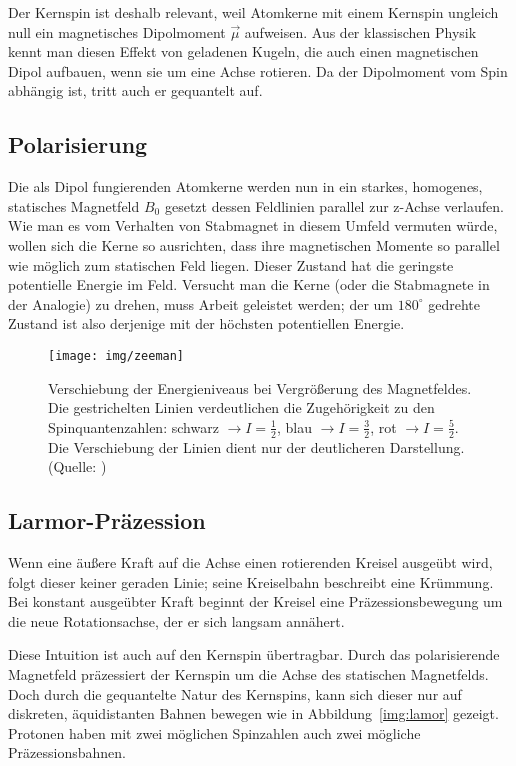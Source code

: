 Der Kernspin ist deshalb relevant, weil Atomkerne mit einem Kernspin ungleich null ein magnetisches Dipolmoment $\vec{\mu}$ aufweisen. Aus der klassischen Physik kennt man diesen Effekt von geladenen Kugeln, die auch einen magnetischen Dipol aufbauen, wenn sie um eine Achse rotieren. Da der Dipolmoment vom Spin abhängig ist, tritt auch er gequantelt auf.

\subsection{Polarisierung}
\label{bsc:polarisation}
Die als Dipol fungierenden Atomkerne werden nun in ein starkes, homogenes, statisches Magnetfeld $B_0$ gesetzt dessen Feldlinien parallel zur z-Achse verlaufen. Wie man es vom Verhalten von Stabmagnet in diesem Umfeld vermuten würde, wollen sich die Kerne so ausrichten, dass ihre magnetischen Momente so parallel wie möglich zum statischen Feld liegen. Dieser Zustand hat die geringste potentielle Energie im Feld. Versucht man die Kerne (oder die Stabmagnete in der Analogie) zu drehen, muss Arbeit geleistet werden; der um $ 180^\circ $ gedrehte Zustand ist also derjenige mit der höchsten potentiellen Energie.

\begin{figure}
  \centering
  \texttt{[image: img/zeeman]}\label{img:zeeman}
  \caption{Verschiebung der Energieniveaus bei Vergrö\ss{}erung des Magnetfeldes. Die gestrichelten Linien verdeutlichen die Zugehörigkeit zu den Spinquantenzahlen: schwarz $\rightarrow{} I=\frac{1}{2} $, blau $ \rightarrow{} I=\frac{3}{2} $, rot $\rightarrow{} I=\frac{5}{2} $. Die Verschiebung der Linien dient nur der deutlicheren Darstellung. (Quelle: )}
\end{figure}

\subsection{Larmor-Präzession}
\label{bsc:larmor}
Wenn eine äu\ss{}ere Kraft auf die Achse einen rotierenden Kreisel ausgeübt wird, folgt dieser keiner geraden Linie; seine Kreiselbahn beschreibt eine Krümmung. Bei konstant ausgeübter Kraft beginnt der Kreisel eine Präzessionsbewegung um die neue Rotationsachse, der er sich langsam annähert.

Diese Intuition ist auch auf den Kernspin übertragbar. Durch das polarisierende Magnetfeld präzessiert der Kernspin um die Achse des statischen Magnetfelds. Doch durch die gequantelte Natur des Kernspins, kann sich dieser nur auf diskreten, äquidistanten Bahnen bewegen wie in Abbildung~\ref{img:lamor} gezeigt. Protonen haben mit zwei möglichen Spinzahlen auch zwei mögliche Präzessionsbahnen.

